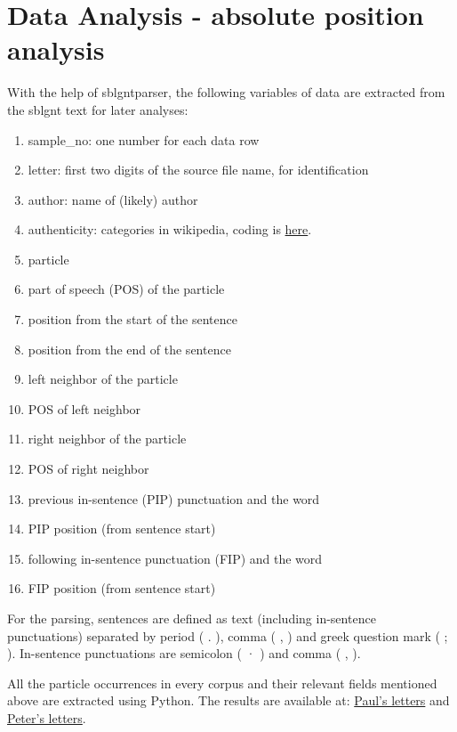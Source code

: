 \documentclass[a4paper]{article}
\begin{document}
\section{Data Analysis - absolute position analysis}
With the help of sblgntparser, the following variables of data are extracted from the sblgnt text for later analyses:
\begin{enumerate}[itemsep=-1mm]
\item sample\_no: one number for each data row
\item letter: first two digits of the source file name, for identification
\item author: name of (likely) author
\item authenticity: categories in wikipedia, coding is \href{https://github.com/KLINGTdotNET/dh-project-ws14/blob/master/data/paul_letters.txt}{here}.
\item particle
\item part of speech (POS) of the particle
\item position from the start of the sentence
\item position from the end of the sentence
\item left neighbor of the particle
\item POS of left neighbor
\item right neighbor of the particle
\item POS of right neighbor
\item previous in-sentence (PIP) punctuation and the word 
\item PIP position (from sentence start)
\item following in-sentence punctuation (FIP) and the word
\item FIP position (from sentence start)
\end{enumerate}

\noindent For the parsing, sentences are defined as text (including in-sentence punctuations) separated by period ( . ), comma ( , ) and greek question mark ( ; ). In-sentence punctuations are semicolon ( \textgreek{·} ) and comma ( , ). 

All the particle occurrences in every corpus and their relevant fields mentioned above are extracted using Python. The results are available at: \href{https://github.com/KLINGTdotNET/dh-project-ws14/tree/master/data/output/paul_par}{Paul's letters} and \href{https://github.com/KLINGTdotNET/dh-project-ws14/tree/master/data/output/peter_par}{Peter's letters}.
\end{document}
